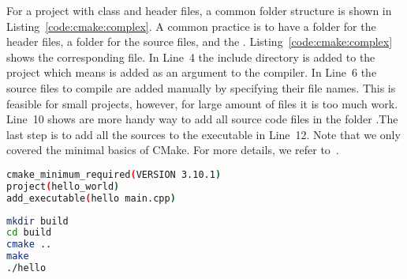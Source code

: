 For a project with class and header files, a common folder structure is shown in Listing~\ref{code:cmake:complex}. A common practice is to have a folder  for the header files, a folder  for the source files, and the . Listing~\ref{code:cmake:complex} shows the corresponding  file. In Line~4 the include directory is added to the project which means  is added as an argument to the compiler. In Line~6 the source files to compile are added manually by specifying their file names. This is feasible for small projects, however, for large amount of files it is too much work. Line~10 shows are more handy way to add all source code files in the folder .The last step is to add all the sources to the executable in Line~12. Note that we only covered the minimal basics of CMake. For more details, we refer to~\cite{cmake}.        


\begin{minipage}{\linewidth}
\begin{minipage}{0.45\linewidth}
\begin{lstlisting}[language=bash,caption={Content of the CMakeLists.txt.\label{code:cmake:main}},emph={project, add_executable,cmake_minimum_required},emphstyle={\color{azure}\bfseries}]
cmake_minimum_required(VERSION 3.10.1)
project(hello_world)
add_executable(hello main.cpp)
\end{lstlisting}
\end{minipage}
\hfill
\begin{minipage}{0.45\linewidth}
\begin{lstlisting}[language=bash,caption={Build instructions for CMake.\label{code:cmake:compile}}]
mkdir build 
cd build
cmake ..
make
./hello
\end{lstlisting}
\end{minipage}
\end{minipage}

